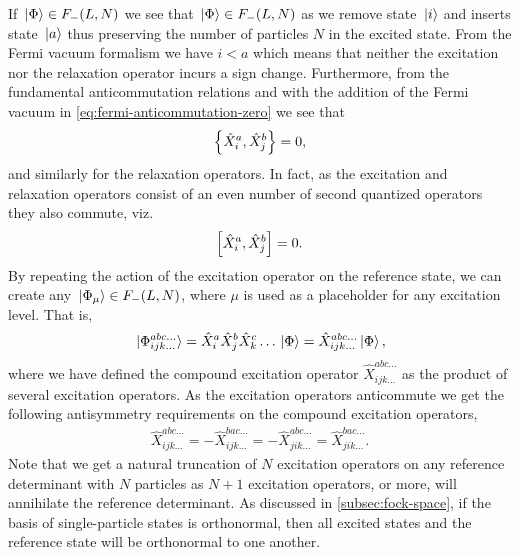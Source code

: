             If $\ket*{\Phi} \in F_{-}(L, N)$ we see that $\ket*{\Phi} \in
            F_{-}(L, N)$ as we remove state $\ket*{i}$ and inserts state
            $\ket*{a}$ thus preserving the number of particles $N$ in the excited
            state.
            From the Fermi vacuum formalism we have $i < a$ which means that
            neither the excitation nor the relaxation operator incurs a sign
            change.
            Furthermore, from the fundamental anticommutation relations and with
            the addition of the Fermi vacuum in
            \autoref{eq:fermi-anticommutation-zero} we see that
            \begin{align}
                \left\{\hat{X}^{a}_{i}, \hat{X}^{b}_{j}\right\}
                = 0,
            \end{align}
            and similarly for the relaxation operators.
            In fact, as the excitation and relaxation operators consist of an
            even number of second quantized operators they also commute, viz.
            \begin{align}
                \left[\hat{X}^{a}_{i}, \hat{X}^{b}_{j}\right] = 0.
            \end{align}
            By repeating the action of the excitation operator on the reference
            state, we can create any $\ket*{\Phi_{\mu}} \in F_{-}(L, N)$, where
            $\mu$ is used as a placeholder for any excitation level.
            That is,
            \begin{align}
                \ket*{\Phi^{abc\dots}_{ijk\dots}}
                = \hat{X}^{a}_{i}\hat{X}^{b}_{j}\hat{X}^{c}_{k}\dots
                \ket*{\Phi}
                = \hat{X}^{abc\dots}_{ijk\dots}\ket*{\Phi},
                \label{eq:antisymmetric-excitation}
            \end{align}
            where we have defined the compound excitation operator
            $\hat{X}^{abc\dots}_{ijk\dots}$ as the product of several excitation
            operators.
            As the excitation operators anticommute we get the following
            antisymmetry requirements on the compound excitation operators,
            \begin{align}
                \hat{X}^{abc\dots}_{ijk\dots}
                =
                -\hat{X}^{bac\dots}_{ijk\dots}
                =
                -\hat{X}^{abc\dots}_{jik\dots}
                =
                \hat{X}^{bac\dots}_{jik\dots}.
            \end{align}
            Note that we get a natural truncation of $N$ excitation operators on
            any reference determinant with $N$ particles as $N + 1$ excitation
            operators, or more, will annihilate the reference determinant.
            As discussed in \autoref{subsec:fock-space}, if the basis of single-particle
            states is orthonormal, then all excited states and the reference
            state will be orthonormal to one another.


